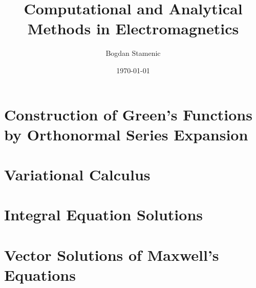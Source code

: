 

\newcommand{\FormelsammlungTitel}{Computational and Analytical Methods in Electromagnetics}
\newcommand{\FormelsammlungAutor}{Bogdan Stamenic}
\setcounter{tocdepth}{2} %


	\title{\FormelsammlungTitel}
	\author{\FormelsammlungAutor}
	\date{\today}
	\begin{multicols*}{3}
			\maketitle
			\tableofcontents
		
		
		
		
		\section{Construction of Green's Functions by Orthonormal Series Expansion}
        \lipsum[5]
		\section{Variational Calculus}
        \lipsum[6]
		\section{Integral Equation Solutions}
        \lipsum[7]
		\section{Vector Solutions of Maxwell's Equations}
        \lipsum[8]
	\end{multicols*}

